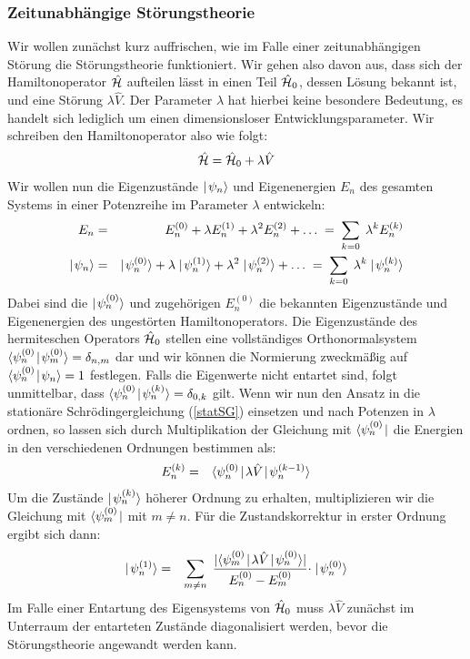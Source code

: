 \subsubsection{Zeitunabhängige Störungstheorie}
Wir wollen zunächst kurz auffrischen, wie im Falle einer zeitunabhängigen Störung die Störungstheorie funktioniert. Wir gehen also davon aus, dass sich der Hamiltonoperator $\hat{\mathcal H}$ aufteilen lässt in einen Teil $\hat{\mathcal H}_0$, dessen Lösung bekannt ist, und eine Störung $\lambda\hat{V}$. Der Parameter $\lambda$ hat hierbei keine besondere Bedeutung, es handelt sich lediglich um einen dimensionsloser Entwicklungsparameter. Wir schreiben den Hamiltonoperator also wie folgt: 
\begin{eqnarray*}
	\hat{\mathcal H} = \hat{\mathcal H}_0+\lambda \hat{V}
\end{eqnarray*}
Wir wollen nun die Eigenzustände $\mid\!\!\!\,\,{\psi_n}\rangle$ und Eigenenergien $E_n$ des gesamten Systems in einer Potenzreihe im Parameter $\lambda$  entwickeln: 
\begin{eqnarray*}
	E_n &=& E_n^{(0)} + \lambda E_n^{(1)} + \lambda^2 E_n^{(2)} + \ldots \;=\;  \sum_{k=0} \;\lambda^k E_n^{(k)}
	\\
	\ket{\psi_n} &=& \ket{\psi_n^{(0)}} + \lambda\ket{\psi_n^{(1)}} + \lambda^2 \ket{\psi_n^{(2)}} + \ldots \;=\; \sum_{k=0} \;\lambda^k \ket{\psi_n^{(k)}}
\end{eqnarray*}
Dabei sind die $\mid\!\!\!\,\,{\psi_n^{(0)}}\rangle$ und zugehörigen $E_n^{(0)}$ die bekannten Eigenzustände und Eigenenergien des ungestörten Hamiltonoperators. Die Eigenzustände des hermiteschen Operators $\hat{\mathcal H}_0$ stellen eine vollständiges Orthonormalsystem $\langle{\psi_n^{(0)}}\!\!\!\,\,\mid\!\!\!\,\,{\psi_m^{(0)}}\rangle=\delta_{n,m}$ dar und wir können die Normierung zweckmäßig auf $\langle{\psi_n^{(0)}}\!\!\!\,\,\mid\!\!\!\,\,{\psi_n}\rangle=1$ festlegen. Falls die Eigenwerte nicht entartet sind, folgt unmittelbar, dass $\langle{\psi_n^{(0)}}\!\!\!\,\,\mid\!\!\!\,\,{\psi_n^{(k)}}\rangle=\delta_{0,k}$ gilt. Wenn wir nun den Ansatz in die stationäre Schrödingergleichung (\ref{statSG}) einsetzen und nach Potenzen in $\lambda$ ordnen, so lassen sich durch Multiplikation der Gleichung mit $\langle{\psi_n^{(0)}}\!\!\!\,\,\mid$ die Energien in den verschiedenen Ordnungen bestimmen als: 
\begin{eqnarray*}
	E_n^{(k)} &=& \bracket{\psi_n^{(0)}}{\lambda\hat{V}}{\psi_n^{(k-1)}}
\end{eqnarray*}
Um die Zustände $\mid\!\!\!\,\,{\psi_n^{(k)}}\rangle$ höherer Ordnung zu erhalten, multiplizieren wir die Gleichung mit $\langle{\psi_m^{(0)}}\!\!\!\,\,\mid$ mit $m\neq n$. Für die Zustandskorrektur in erster Ordnung ergibt sich dann: 
\begin{eqnarray*}
	\ket{\psi_n^{(1)}} &=& \sum_{m\neq n} \; \frac{|\bracket{\psi_m^{(0)}}{\lambda\hat{V}}{\psi_n^{(0)}}|}{E_n^{(0)}-E_m^{(0)}}\cdot \ket{\psi_n^{(0)}}
\end{eqnarray*}
Im Falle einer Entartung des Eigensystems von $\hat{\mathcal H}_0$ muss $\lambda\hat{V}$ zunächst im Unterraum der entarteten Zustände diagonalisiert werden, bevor die Störungstheorie angewandt werden kann. 


